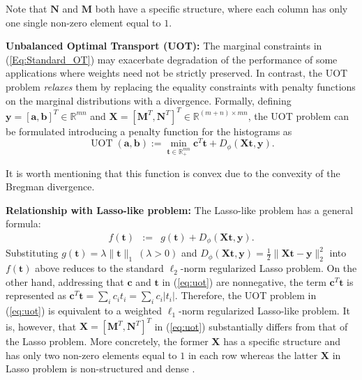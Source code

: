 \documentclass[twoside]{article}
\theoremstyle{plain}
\newcommand{\R}{\mathbb{R}}
\newcommand{\mat}[1]{\mathbf{#1}}
\renewcommand{\vec}[1]{\bm{#1}}
\begin{document}
Note that $\mat{N}$ and $\mat{M}$ both have a specific structure, where each column has only one single non-zero element equal to $1$. 

 
{\bf Unbalanced Optimal Transport (UOT):} The marginal constraints in (\ref{Eq:Standard_OT}) may exacerbate degradation of the performance of some applications where weights need not be strictly preserved. In contrast, the UOT problem {\it relaxes} them by replacing the equality constraints with penalty functions on the marginal distributions with a divergence. Formally, defining $\vec{y} = [\vec{a}, \vec{b}]^T \in \mathbb{R}^{mn}$ and $\mat{X} = [\mat{M}^T,\mat{N}^T]^T \in \mathbb{R}^{(m+n) \times mn}$, the UOT problem can be formulated introducing a penalty function for the histograms as \citep{Chapel_NeurIPS_2021}
\begin{equation}
\label{eq:uot}
\operatorname{UOT}(\vec{a},\vec{b}) := \min_{\vec{t} \in \R_{+}^{mn}} \vec{c}^T\vec{t} + D_\phi(\mat{X}\vec{t},\vec{y}).
\end{equation}

It is worth mentioning that this function is convex due to the convexity of the Bregman divergence.

{\bf Relationship with Lasso-like problem:} 
The Lasso-like problem has a general formula:
%
\begin{eqnarray*}
f(\vec{t}) &:=& g(\vec{t}) + D_\phi(\mat{X} \vec{t},\vec{y}).
\end{eqnarray*}
Substituting $g(\vec{t}) = \lambda \|\vec{t}\|_1~(\lambda > 0)$ and $D_\phi(\mat{X} \vec{t},\vec{y}) = \frac{1}{2}\|\mat{X} \vec{t}-\vec{y}\|_2^2$ into $f(\vec{t})$ above reduces to the standard $\ell_2$-norm regularized Lasso problem. On the other hand, addressing that $\vec{c}$ and $\vec{t}$ in (\ref{eq:uot}) are nonnegative, the term $\vec{c}^T\vec{t}$ is represented as $\vec{c}^T\vec{t}=\sum_i c_i t_i = \sum_ic_i |t_i|$. Therefore, the UOT problem in (\ref{eq:uot}) is equivalent to a weighted $\ell_1$-norm regularized Lasso-like problem. It is, however, that $\mat{X} = [\mat{M}^T,\mat{N}^T]^T$ in (\ref{eq:uot}) substantially differs from that of the Lasso problem. More concretely, the former $\mat{X}$ has a specific structure and has only two non-zero elements equal to $1$ in each row whereas the latter $\mat{X}$ in Lasso problem is non-structured and dense \citep{Chapel_NeurIPS_2021}.
\end{document}
